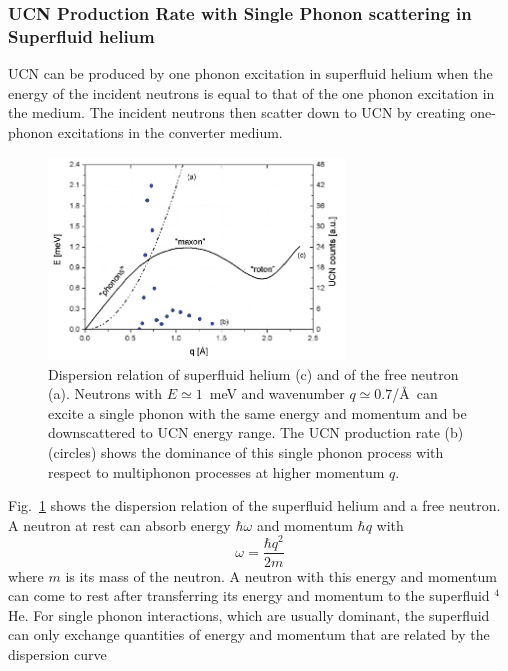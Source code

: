 \subsubsection{UCN Production Rate with Single Phonon scattering in
  Superfluid
  helium~\cite{Korobkina2002,Schmidt2009,Golub77}\label{sec:UCN_production}}
UCN can be produced by one phonon excitation in superfluid helium when
the energy of the incident neutrons is equal to that of the one phonon
excitation in the medium. The incident neutrons then scatter down to
UCN by creating one-phonon excitations in the converter medium.
\begin{figure}[h!]
\begin{center}
   \includegraphics[width=0.7\textwidth]{FIG1_2.PNG}
    \caption{\cite{PSI_news} Dispersion relation of superfluid
      helium (c) and of the free neutron (a). Neutrons with $E\simeq
      1$~meV and wavenumber $q \simeq 0.7$/\AA~can excite a single
      phonon with the same energy and momentum and be downscattered to
      UCN energy range. The UCN production rate (b)(circles) shows the
      dominance of this single phonon process with respect to
      multiphonon processes at higher momentum $q$.
    }
    \label{fig:FIG1}
    \end{center}
\end{figure} 
Fig.~\ref{fig:FIG1} shows the dispersion relation of the superfluid
helium and a free neutron. A neutron at rest can absorb energy $\hbar
\omega$ and momentum $\hbar q$ with
\begin{equation}
\label{neutron_energy}
\omega=\frac{\hbar q^2}{2m}
\end{equation}
where $m$ is its mass of the neutron. A neutron with this energy and momentum can
come to rest after transferring its energy and momentum to the
superfluid $^4$He. For single phonon interactions, which are usually
dominant, the superfluid can only exchange quantities of energy and
momentum that are related by the dispersion curve

